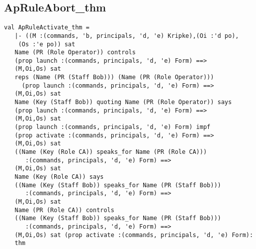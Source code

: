 \documentclass{report}
\begin{document}
\subsection{ApRuleAbort_thm}
\label{op-14-4}
\begin{session}
  \begin{scriptsize}
\begin{verbatim}
val ApRuleActivate_thm =
   |- ((M :(commands, 'b, principals, 'd, 'e) Kripke),(Oi :'d po),
    (Os :'e po)) sat
   Name (PR (Role Operator)) controls
   (prop launch :(commands, principals, 'd, 'e) Form) ==>
   (M,Oi,Os) sat
   reps (Name (PR (Staff Bob))) (Name (PR (Role Operator)))
     (prop launch :(commands, principals, 'd, 'e) Form) ==>
   (M,Oi,Os) sat
   Name (Key (Staff Bob)) quoting Name (PR (Role Operator)) says
   (prop launch :(commands, principals, 'd, 'e) Form) ==>
   (M,Oi,Os) sat
   (prop launch :(commands, principals, 'd, 'e) Form) impf
   (prop activate :(commands, principals, 'd, 'e) Form) ==>
   (M,Oi,Os) sat
   ((Name (Key (Role CA)) speaks_for Name (PR (Role CA)))
      :(commands, principals, 'd, 'e) Form) ==>
   (M,Oi,Os) sat
   Name (Key (Role CA)) says
   ((Name (Key (Staff Bob)) speaks_for Name (PR (Staff Bob)))
      :(commands, principals, 'd, 'e) Form) ==>
   (M,Oi,Os) sat
   Name (PR (Role CA)) controls
   ((Name (Key (Staff Bob)) speaks_for Name (PR (Staff Bob)))
      :(commands, principals, 'd, 'e) Form) ==>
   (M,Oi,Os) sat (prop activate :(commands, principals, 'd, 'e) Form):
   thm
\end{verbatim}
  \end{scriptsize}
\end{session}
\end{document}
